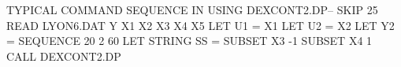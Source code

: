 TYPICAL COMMAND SEQUENCE IN USING DEXCONT2.DP--
   SKIP 25
   READ LYON6.DAT Y X1 X2 X3 X4 X5
   LET U1 = X1
   LET U2 = X2
   LET Y2 = SEQUENCE 20 2 60
   LET STRING SS = SUBSET X3 -1 SUBSET X4 1
   CALL DEXCONT2.DP
